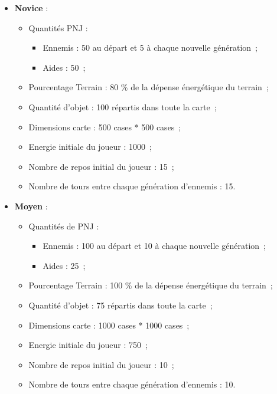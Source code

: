 \documentclass[11pt]{article}
\begin{document}
\begin{itemize}
 \item \textbf{Novice} :

	\begin{itemize}
		\item Quantités PNJ :
		
		\begin{itemize}
			\item Ennemis : 50 au départ et 5 à chaque nouvelle génération~;
			\item Aides : 50~;
		\end{itemize}

		\item Pourcentage Terrain : 80 \% de la dépense énergétique du terrain~;
		\item Quantité d'objet : 100 répartis dans toute la carte~;
		\item Dimensions carte : 500 cases * 500 cases~;
		\item Energie initiale du joueur : 1000~;
		\item Nombre de repos initial du joueur : 15~;
		\item Nombre de tours entre chaque génération d'ennemis : 15.

	\end{itemize}

 \item \textbf{Moyen} :

		\begin{itemize}
			\item Quantités de PNJ :
			
			\begin{itemize}
				\item Ennemis : 100 au départ et 10 à chaque nouvelle génération~;
				\item Aides : 25~;
			\end{itemize}

			\item Pourcentage Terrain : 100 \% de la dépense énergétique du terrain~;
			\item Quantité d'objet : 75 répartis dans toute la carte~;
			\item Dimensions carte : 1000 cases * 1000 cases~;
			\item Energie initiale du joueur : 750~;
			\item Nombre de repos initial du joueur : 10~;
			\item Nombre de tours entre chaque génération d'ennemis : 10.


\end{itemize}
\end{itemize}
\end{document}
